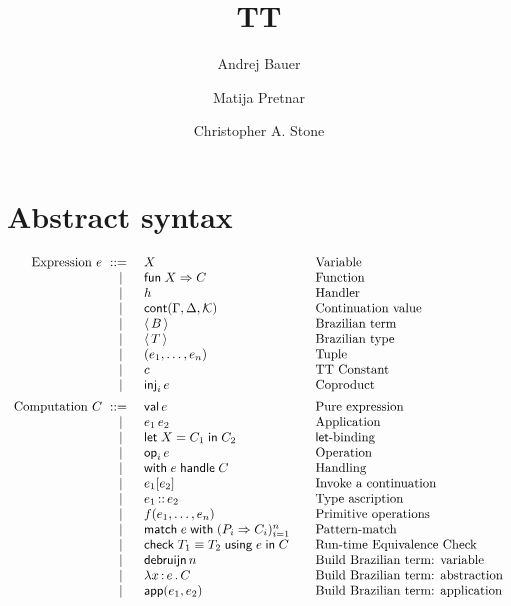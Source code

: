 \documentclass{article}
\newcommand{\C}{C}     %
\newcommand{\X}{X}     %
\newcommand{\rgn}{r}   %
\newcommand{\B}{B}     %
\newcommand{\KK}{{\cal K}} %
\newcommand{\val}{\mathsf{val}\,} %
\newcommand{\letin}[1]{\mathsf{let}\; #1 \;\mathsf{in}\;} %
\newcommand{\opOp}[2][i]{\mathsf{op}_{#1}\,#2} %
\newcommand{\withhandle}[1]{\mathsf{with}\;#1\;\mathsf{handle}\;} %
\newcommand{\abs}[1]{\mathsf{abs}\;#1\;\mathsf{in}\;} %
\newcommand{\new}[2]{\mathsf{new}(#1,#2)} %
\newcommand{\fun}[1]{\mathsf{fun}\;#1\Rightarrow} %
\newcommand{\ttapp}[2]{#1\,#2} %
\newcommand{\ttlam}[2]{\lambda #1 \,{:}\, #2 \,.\,} %
\newcommand{\kapp}[2]{#1{}[#2]} %
\newcommand{\bterm}[1]{\langle\,#1\,\rangle} %
\newcommand{\bty}[1]{\langle\,#1\,\rangle} %
\newcommand{\makeApp}[2]{\mathsf{app}(#1,#2)} %
\newcommand{\debruijn}[1]{\mathsf{debruijn}\,#1} %
\newcommand{\cont}[2][\G,\D]{\mathsf{cont}(#1,#2)}     %
\newcommand{\tuple}[1]{(#1)}
\newcommand{\generictuple}[1][n]{\tuple{e_1,\ldots,\e_{#1}}}
\newcommand{\pat}{P}
\newcommand{\match}[2]{\mathsf{match}\; #1\; \mathsf{with}\;#2}
\newcommand{\genericPats}[1][n]{(\pat_i \Rightarrow \C_i)_{i=1}^n}
\newcommand{\genericmatch}[1][\e]{\match{#1}{\genericPats}}
\renewcommand{\c}{c} %
\newcommand{\prim}[2][f]{#1(#2)} %
\newcommand{\genericprim}{\prim{\e_1,\ldots,\e_n}}
\newcommand{\inj}[2][i]{\mathsf{inj}_{#1}\, #2}
\newcommand{\assertEquivType}[3]{\mathsf{check}\;#1\equiv #2\;\mathsf{using}\;#3\;\mathsf{in}\;}
\begin{document}
\title{TT}
\author{Andrej Bauer \and Matija Pretnar \and Christopher A. Stone}
\maketitle

\section{Abstract syntax}
\label{sec:abstract-syntax}

\begin{equation*}
  \begin{array}{rl@{\qquad}l}
  \text{Expression $\e$}
    \bnf    & \X          & \text{Variable} \\
    \bnfor  & \fun{\X} \C  & \text{Function} \\
    \bnfor  & h           & \text{Handler} \\
    \bnfor  & \cont{\KK} & \text{Continuation value} \\
    \bnfor  & \bterm{\B}         & \text{Brazilian term} \\
    \bnfor  & \bty{\T}           & \text{Brazilian type} \\
    \bnfor  & \generictuple   & \text{Tuple}\\
    \bnfor  & \c              & \text{TT Constant}\\
    \bnfor  & \inj{\e}        & \text{Coproduct}\\[5pt]

    \text{Computation $\C$}
      \bnf  & \val \e                & \text{Pure expression} \\
    \bnfor  & \ttapp{\e_1}{\e_2}   & \text{Application} \\
    \bnfor  & \letin{\X = \C_1} \C_2  & \text{$\mathsf{let}$-binding} \\
    \bnfor  & \opOp{\e} & \text{Operation} \\
    \bnfor  & \withhandle{\e} \C & \text{Handling} \\
    \bnfor  & \kapp{\e_1}{\e_2}   & \text{Invoke a continuation} \\
    \bnfor  & \ascribe{\e_1}{\e_2} & \text{Type ascription} \\
    \bnfor  & \genericprim & \text{Primitive operations}\\
    \bnfor  & \genericmatch& \text{Pattern-match}\\
    \bnfor  & \assertEquivType{\T_1}{\T_2}{\e}{\C} & \text{Run-time Equivalence Check}\\
    \bnfor  & \debruijn{n} & \text{Build Brazilian term: variable} \\
    \bnfor  & \ttlam{\x}{\e} \C   & \text{Build Brazilian term: abstraction} \\
    \bnfor  & \makeApp{\e_1}{\e_2} & \text{Build Brazilian term: application} \\[5pt]


\end{array}
\end{equation*}
\end{document}
